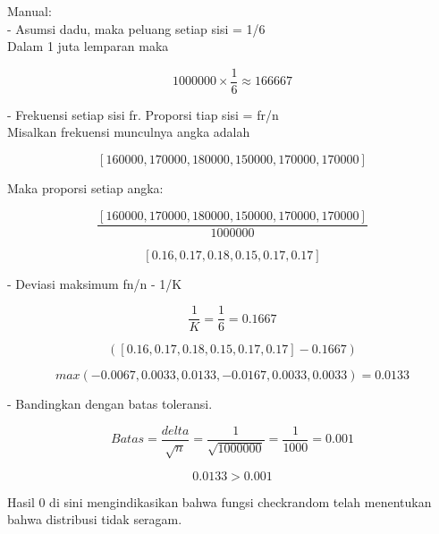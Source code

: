 \documentclass{article}
\begin{document}
\begin{eulernotebook}
\begin{eulercomment}
\begin{eulercomment}
\begin{eulercomment}
Manual:\\
- Asumsi dadu, maka peluang setiap sisi = 1/6\\
Dalam 1 juta lemparan maka\\
\end{eulercomment}
\begin{eulerformula}
\[
1000000 \times \frac{1}{6} \approx 166667
\]
\end{eulerformula}
\begin{eulercomment}
- Frekuensi setiap sisi fr. Proporsi tiap sisi = fr/n\\
Misalkan frekuensi munculnya angka adalah\\
\end{eulercomment}
\begin{eulerformula}
\[
[160000, 170000, 180000, 150000, 170000, 170000]
\]
\end{eulerformula}
\begin{eulercomment}
Maka proporsi setiap angka:\\
\end{eulercomment}
\begin{eulerformula}
\[
\frac{[160000, 170000, 180000, 150000, 170000, 170000]}{1000000}
\]
\end{eulerformula}
\begin{eulerformula}
\[
[0.16, 0.17, 0.18, 0.15, 0.17, 0.17]
\]
\end{eulerformula}
\begin{eulercomment}
- Deviasi maksimum fn/n - 1/K\\
\end{eulercomment}
\begin{eulerformula}
\[
\frac{1}{K} = \frac{1}{6} = 0.1667
\]
\end{eulerformula}
\begin{eulerformula}
\[
([0.16, 0.17, 0.18, 0.15, 0.17, 0.17]-0.1667)
\]
\end{eulerformula}
\begin{eulerformula}
\[
max(-0.0067, 0.0033, 0.0133, -0.0167, 0.0033, 0.0033)= 0.0133
\]
\end{eulerformula}
\begin{eulercomment}
- Bandingkan dengan batas toleransi.\\
\end{eulercomment}
\begin{eulerformula}
\[
Batas= \frac{delta}{\sqrt{n}} = \frac{1}{\sqrt{1000000}} = \frac{1}{1000} = 0.001
\]
\end{eulerformula}
\begin{eulerformula}
\[
0.0133>0.001
\]
\end{eulerformula}
\begin{eulercomment}
Hasil 0 di sini mengindikasikan bahwa fungsi checkrandom telah
menentukan bahwa distribusi tidak seragam.


\end{eulercomment}
\end{eulercomment}
\end{eulercomment}
\end{eulernotebook}
\end{document}
